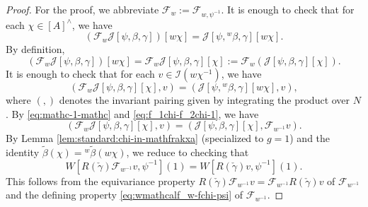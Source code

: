\documentclass[reqno]{amsart}
\theoremstyle{plain} \newtheorem{theorem} {Theorem}
\theoremstyle{definition} \newtheorem{definition} [theorem] {Definition}
\theoremstyle{itplain} %
\numberwithin{equation}{section}
\numberwithin{theorem}{section}
\begin{document}
\begin{proof}
  For the proof, we abbreviate $\mathcal{F}_w := \mathcal{F}_{w,\psi^{-1}}$.  It is enough to check that for each $\chi \in [A]^\wedge$, we have
  \begin{equation*}
    (\mathcal{F}_w \mathcal{J}[\psi,\beta,\gamma])[ w \chi] = \mathcal{J}[{\psi,{}^w \beta, \gamma}][w \chi].
  \end{equation*}
  By definition,
  \begin{equation*}
    (\mathcal{F}_w \mathcal{J}[\psi,\beta,\gamma])[ w \chi] = \mathcal{F}_w \mathcal{J}[\psi,\beta,\gamma][\chi]
    :=
    \mathcal{F}_w (\mathcal{J}[\psi,\beta,\gamma][\chi]).
  \end{equation*}
  It is enough to check that for each $v \in \mathcal{I}(w \chi^{-1})$, we have
\begin{equation*}
  (\mathcal{F}_w \mathcal{J}[\psi,\beta,\gamma][\chi], v)
  =
  (\mathcal{J}[{\psi,{}^w \beta, \gamma}][w \chi], v),
\end{equation*}
where $(,)$ denotes the invariant pairing given by integrating the product over $N$.  By \eqref{eq:mathc-1-mathc} and \eqref{eq:f_1chi-f_2chi-1}, we have
\begin{equation*}
(\mathcal{F}_w \mathcal{J}[\psi,\beta,\gamma][\chi], v) = (\mathcal{J}[\psi,\beta,\gamma][\chi], \mathcal{F}_{w^{-1}} v).
\end{equation*}
 By Lemma \ref{lem:standard:chi-in-mathfrakxa} (specialized to $g=1$) and the identity $\tilde{\beta}(\chi) = {}^w \tilde{\beta}(w \chi)$, we reduce to checking that
\begin{equation*}
  W[R(\check{\gamma}) \mathcal{F}_{w^{-1}} v, \psi^{-1}](1)
  =
  W[R(\check{\gamma}) v, \psi^{-1}](1).
\end{equation*}
This follows from the equivariance property $R(\check{\gamma}) \mathcal{F}_{w^{-1}} v = \mathcal{F}_{w^{-1}} R(\check{\gamma}) v$ of $\mathcal{F}_{w^{-1}}$ and the defining property \eqref{eq:wmathcalf_w-fchi-psi} of $\mathcal{F}_{w^{-1}}$.
\end{proof}
\end{document}
